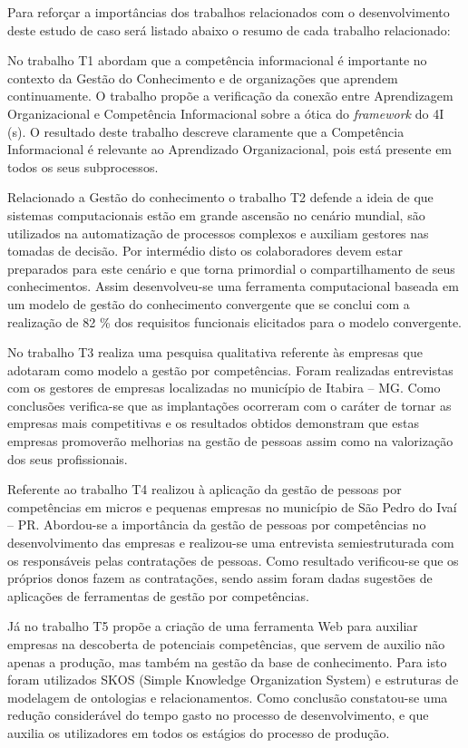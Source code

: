 Para reforçar a importâncias dos trabalhos relacionados com o desenvolvimento deste estudo de caso será listado abaixo o resumo de cada trabalho relacionado:

No trabalho T1  abordam que a competência informacional é importante no contexto da Gestão do Conhecimento e de organizações que aprendem continuamente. O trabalho propõe a verificação da conexão entre Aprendizagem Organizacional e Competência Informacional sobre a ótica do \textit{framework} do 4I (s). O resultado deste trabalho descreve claramente que a Competência Informacional é relevante ao Aprendizado Organizacional, pois está presente em todos os seus subprocessos.

Relacionado a Gestão do conhecimento o trabalho T2  defende a ideia de que sistemas computacionais estão em grande ascensão no cenário mundial, são utilizados na automatização de processos complexos e auxiliam gestores nas tomadas de decisão. Por intermédio disto os colaboradores devem estar preparados para este cenário e que torna primordial o compartilhamento de seus conhecimentos. Assim desenvolveu-se uma ferramenta computacional baseada em um modelo de gestão do conhecimento convergente que se conclui com a realização de 82 \% dos requisitos funcionais elicitados para o modelo convergente.

No trabalho T3  realiza uma pesquisa qualitativa referente às empresas que adotaram como modelo a gestão por competências. Foram realizadas entrevistas com os gestores de empresas localizadas no município de Itabira – MG. Como conclusões verifica-se que as implantações ocorreram com o caráter de tornar as empresas mais competitivas e os resultados obtidos demonstram que estas empresas promoverão melhorias na gestão de pessoas assim como na valorização dos seus profissionais.

Referente ao trabalho T4  realizou à aplicação da gestão de pessoas por competências em micros e pequenas empresas no município de São Pedro do Ivaí – PR. Abordou-se a importância da gestão de pessoas por competências no desenvolvimento das empresas e realizou-se uma entrevista semiestruturada com os responsáveis pelas contratações de pessoas. Como resultado verificou-se que os próprios donos fazem as contratações, sendo assim foram dadas sugestões de aplicações de ferramentas de gestão por competências.

Já no trabalho T5  propõe a criação de uma ferramenta Web para auxiliar empresas na descoberta de potenciais competências, que servem de auxilio não apenas a produção, mas também na gestão da base de conhecimento. Para isto foram utilizados SKOS (Simple Knowledge Organization System) e estruturas de modelagem de ontologias e relacionamentos. Como conclusão constatou-se uma redução considerável do tempo gasto no processo de desenvolvimento, e que auxilia os utilizadores em todos os estágios do processo de produção.

